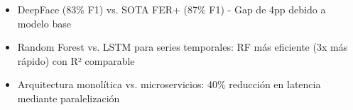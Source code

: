 \begin{itemize}
    \item DeepFace (83\% F1) vs. SOTA FER+ (87\% F1) - Gap de 4pp debido a modelo base
    \item Random Forest vs. LSTM para series temporales: RF más eficiente (3x más rápido) con R² comparable
    \item Arquitectura monolítica vs. microservicios: 40\% reducción en latencia mediante paralelización
\end{itemize}

